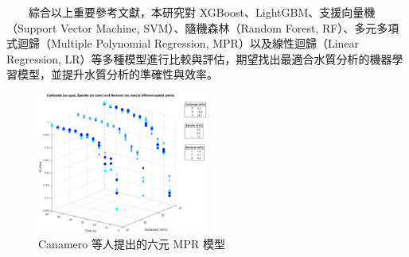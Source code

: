 \documentclass[12pt,a4paper]{article}
\begin{document}
\begin{enumerate}
\begin{enumerate}[label=\arabic*.]
　　綜合以上重要參考文獻，本研究對 XGBoost、LightGBM、支援向量機（Support Vector Machine, SVM）、隨機森林（Random Forest, RF）、多元多項式迴歸（Multiple Polynomial Regression, MPR）以及線性迴歸（Linear Regression, LR）等多種模型進行比較與評估，期望找出最適合水質分析的機器學習模型，並提升水質分析的準確性與效率。
    \begin{figure}[H]
        \centering
        \includegraphics[width=0.5\textwidth]{resources/image/Canamero et al.(2023).png}
        \caption{Canamero 等人提出的六元 MPR 模型}
        \label{fig:MPR_validation}
    \end{figure}
\end{enumerate}


\end{enumerate}
\end{document}
